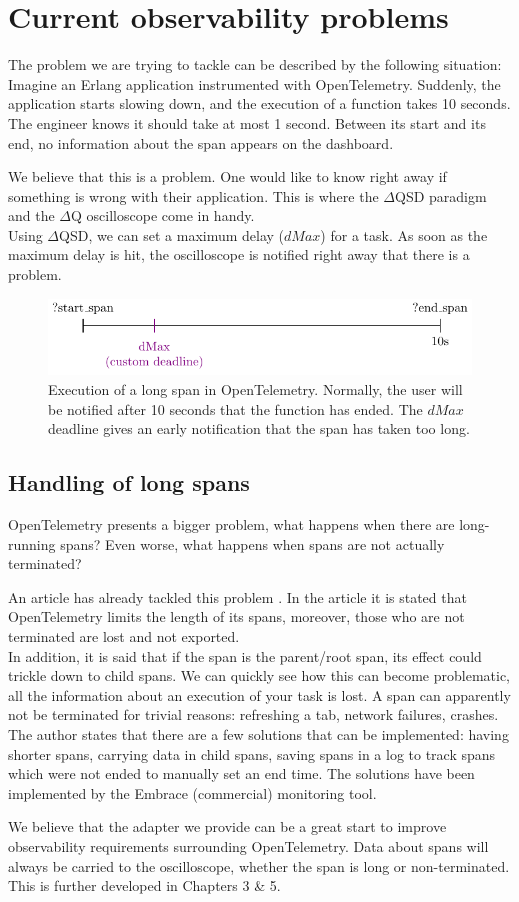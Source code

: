 \section{Current observability problems}
    The problem we are trying to tackle can be described by the following situation: 
    Imagine an Erlang application instrumented with OpenTelemetry. Suddenly, the application starts slowing down, and the execution of a function takes 10 seconds. The engineer knows it should take at most 1 second. Between its start and its end, no information about the span appears on the dashboard.
    
    We believe that this is a problem. One would like to know right away if something is wrong with their application. This is where the $\Delta$QSD paradigm and the $\Delta$Q oscilloscope come in handy. \\ 
   Using $\Delta$QSD, we can set a maximum delay ($dMax$) for a task. As soon as the maximum delay is hit, the oscilloscope is notified right away that there is a problem.
   
   \begin{figure}[H]
        \begin{center}
            \includegraphics{tikz/start_end_dmax.pdf}
        \end{center}
        \caption{Execution of a long span in OpenTelemetry. Normally, the user will be notified after 10 seconds that the function has ended. The $dMax$ deadline gives an early notification that the span has taken too long.}
        \label{fig:otel_dmax}
    \end{figure} 


    \subsection{Handling of long spans}
        OpenTelemetry presents a bigger problem, what happens when there are long-running spans? Even worse, what happens when spans are not actually terminated?
        
        An article has already tackled this problem \cite{otel-l}. In the article it is stated that OpenTelemetry limits the length of its spans, moreover, those who are not terminated are lost and not exported. \\ 
        In addition, it is said that if the span is the parent/root span, its effect could trickle down to child spans. We can quickly see how this can become problematic, all the information about an execution of your task is lost. A span can apparently not be terminated for trivial reasons: refreshing a tab, network failures, crashes. The author states that there are a few solutions that can be implemented: having shorter spans, carrying data in child spans, saving spans in a log to track spans which were not ended to manually set an end time. The solutions have been implemented by the Embrace (commercial) monitoring tool. \cite{embr}

     We believe that the adapter we provide can be a great start to improve observability requirements surrounding OpenTelemetry. Data about spans will always be carried to the oscilloscope, whether the span is long or non-terminated. This is further developed in Chapters 3 \& 5.
